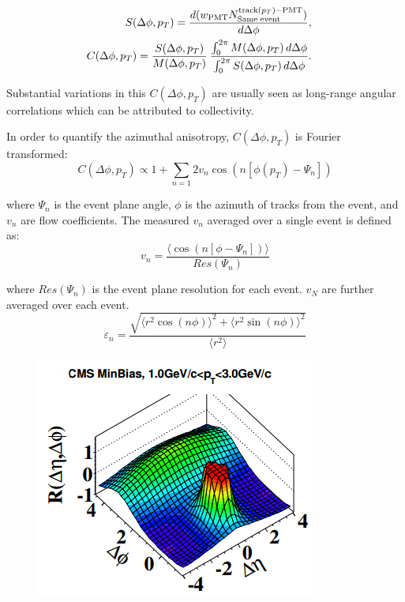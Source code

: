 

\begin{eqnarray}
  S(\Delta\phi,p_{T})=
  \frac{ d(w_{{\rm PMT}} N^{{\rm track}(p_{T}){\rm - PMT}}_{{\rm Same \; event}}) }{ d\Delta\phi}, & &
\label{eq31} \\
  C(\Delta\phi,p_{T}) =
          \frac{S(\Delta\phi,p_{T})}{M(\Delta\phi,p_{T})} \:
          \frac{\int_{0}^{2\pi} M(\Delta\phi,p_{T}) \, d\Delta\phi}{\int_{0}^{2\pi} S(\Delta\phi,p_{T}) \, d\Delta\phi}. & &
  \label{eq:def_corr_function}
\end{eqnarray}

Substantial variations in this $C(\Delta\phi,p_T)$ are usually seen as long-range angular correlations which can be attributed to collectivity.

In order to quantify the azimuthal anisotropy, $C(\Delta\phi,p_T)$ is Fourier transformed:
\begin{equation}\label{eqn:dndphi}
  C(\Delta\phi,p_T) \propto 1 + \sum_{n=1}2 v_{n}\cos(n[\phi(p_T)-\Psi_n]) 
\end{equation}

where $\Psi_n$ is the event plane angle, $\phi$ is the azimuth of tracks from the event, and $v_n$ are flow coefficients. The measured $v_n$ averaged over a single event is defined as:
\begin{equation}\label{eqn:vn}
  v_n = \frac{\langle\cos(n[\phi-\Psi_n])\rangle}{Res(\Psi_n)}
\end{equation}

where $Res(\Psi_n)$ is the event plane resolution for each event. $v_N$ are further averaged over each event.
\begin{equation}
\varepsilon_n = \frac{\sqrt{\langle r^2\cos (n\phi)\rangle ^2 + \langle r^2\sin (n\phi) \rangle ^2}}{\langle r^2 \rangle}
\end{equation}

\begin{figure}[h!]
\begin{center}
\includegraphics[width=0.45\linewidth]{figs/pp_correlation_function_min_bias.png}
\caption{ }
\label{fig:pp_corr_func_minbias}
\end{center}
\end{figure}

